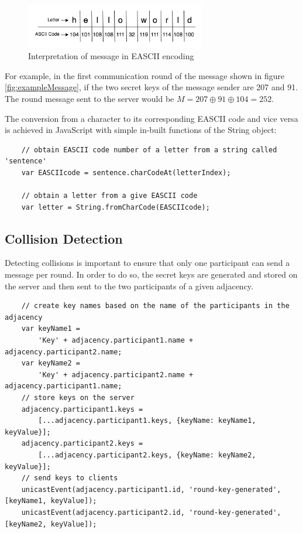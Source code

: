\begin{figure}[H]
    \centering
    \includegraphics[width=0.70\textwidth]{Images/Implementation/messageInASCII.png}
    \caption{Interpretation of message in EASCII encoding}
    \label{fig:exampleInASCII}
\end{figure}

For example, in the first communication round of the message shown in figure \ref{fig:exampleMessage}, if the two secret keys of the message sender are 207 and 91. The round message sent to the server would be $M = 207 \oplus 91 \oplus 104 = 252$.

The conversion from a character to its corresponding EASCII code and vice versa is achieved in JavaScript with simple in-built functions of the String object: 
\begin{lstlisting}
    // obtain EASCII code number of a letter from a string called 'sentence'
    var EASCIIcode = sentence.charCodeAt(letterIndex);

    // obtain a letter from a give EASCII code
    var letter = String.fromCharCode(EASCIIcode);
\end{lstlisting}



\subsection{Collision Detection}
Detecting collisions is important to ensure that only one participant can send a message per round. In order to do so, the secret keys are generated and stored on the server and then sent to the two participants of a given adjacency. 

\begin{lstlisting}
    // create key names based on the name of the participants in the adjacency
    var keyName1 = 
        'Key' + adjacency.participant1.name + adjacency.participant2.name;
    var keyName2 = 
        'Key' + adjacency.participant2.name + adjacency.participant1.name;
    // store keys on the server
    adjacency.participant1.keys = 
        [...adjacency.participant1.keys, {keyName: keyName1, keyValue}];
    adjacency.participant2.keys = 
        [...adjacency.participant2.keys, {keyName: keyName2, keyValue}];
    // send keys to clients
    unicastEvent(adjacency.participant1.id, 'round-key-generated', [keyName1, keyValue]);
    unicastEvent(adjacency.participant2.id, 'round-key-generated', [keyName2, keyValue]);
\end{lstlisting}


